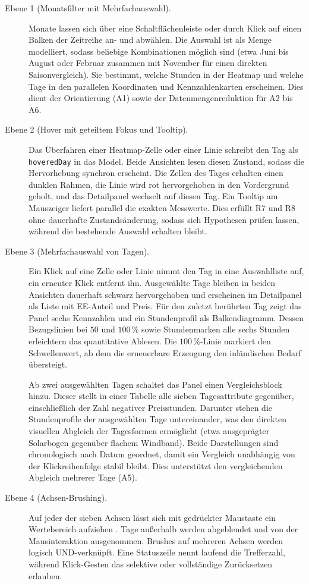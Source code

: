 \begin{description}
  \item[Ebene 1 (Monatsfilter mit Mehrfachauswahl).] Monate lassen sich über eine
        Schaltflächenleiste oder durch Klick auf einen Balken der Zeitreihe an- und abwählen. Die Auswahl
        ist als Menge modelliert, sodass beliebige Kombinationen möglich sind (etwa Juni bis August
        oder Februar zusammen mit November für einen direkten Saisonvergleich). Sie bestimmt, welche
        Stunden in der Heatmap und welche Tage in den parallelen Koordinaten und Kennzahlenkarten erscheinen.
        Dies dient der Orientierung (A1) sowie der Datenmengenreduktion für A2 bis A6.
  \item[Ebene 2 (Hover mit geteiltem Fokus und Tooltip).] Das Überfahren einer Heatmap-Zelle
        oder einer Linie schreibt den Tag als \texttt{hoveredDay} in das Model. Beide Ansichten lesen diesen
        Zustand, sodass die Hervorhebung synchron erscheint. Die Zellen des Tages erhalten einen
        dunklen Rahmen, die Linie wird rot hervorgehoben in den Vordergrund geholt, und das Detailpanel wechselt auf
        diesen Tag. Ein Tooltip am Mauszeiger liefert parallel die exakten Messwerte. Dies erfüllt R7
        und R8 ohne dauerhafte Zustandsänderung, sodass sich Hypothesen prüfen lassen, während die bestehende Auswahl
        erhalten bleibt.
  \item[Ebene 3 (Mehrfachauswahl von Tagen).] Ein Klick auf eine Zelle oder Linie nimmt den Tag in
        eine Auswahlliste auf, ein erneuter Klick entfernt ihn. Ausgewählte Tage bleiben in beiden Ansichten
        dauerhaft schwarz hervorgehoben und erscheinen im Detailpanel als Liste mit EE-Anteil und Preis.
        Für den zuletzt berührten Tag zeigt das Panel sechs Kennzahlen und ein Stundenprofil als
        Balkendiagramm. Dessen Bezugslinien bei $50$ und $100\,\%$ sowie Stundenmarken alle sechs Stunden
        erleichtern das quantitative Ablesen. Die $100\,\%$-Linie markiert den Schwellenwert, ab dem die
        erneuerbare Erzeugung den inländischen Bedarf übersteigt.

        Ab zwei ausgewählten Tagen schaltet das Panel einen Vergleichsblock hinzu. Dieser stellt in einer
        Tabelle alle sieben Tagesattribute gegenüber, einschließlich der Zahl negativer Preisstunden.
        Darunter stehen die Stundenprofile der ausgewählten Tage untereinander, was den direkten visuellen
        Abgleich der Tagesformen ermöglicht (etwa ausgeprägter Solarbogen gegenüber flachem Windband).
        Beide Darstellungen sind chronologisch nach Datum geordnet, damit ein Vergleich unabhängig von der
        Klickreihenfolge stabil bleibt. Dies unterstützt den vergleichenden Abgleich mehrerer Tage (A5).
  \item[Ebene 4 (Achsen-Brushing).] Auf jeder der sieben Achsen lässt sich mit gedrückter
        Maustaste ein Wertebereich aufziehen \cite{Becker1987}. Tage außerhalb werden abgeblendet und von
        der Mausinteraktion ausgenommen. Brushes auf mehreren Achsen werden logisch UND-verknüpft. Eine
        Statuszeile nennt laufend die Trefferzahl, während Klick-Gesten das selektive oder vollständige
        Zurücksetzen erlauben.
\end{description}

